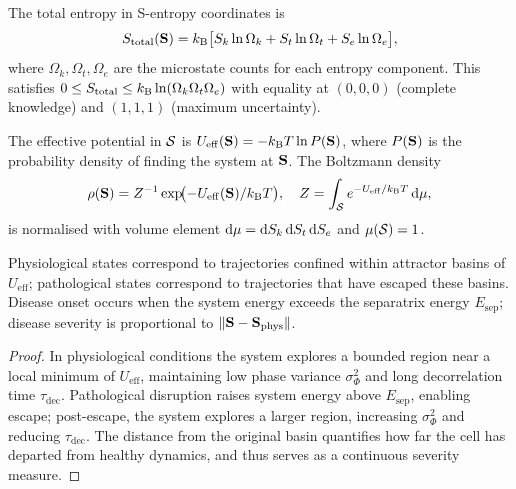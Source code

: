 The total entropy in S-entropy coordinates is
\begin{equation}
  S_{\mathrm{total}}(\mathbf{S})
  = k_{\mathrm{B}}\bigl[S_k\ln\Omega_k + S_t\ln\Omega_t + S_e\ln\Omega_e\bigr],
  \label{eq:ch07-total-entropy}
\end{equation}
where $\Omega_k,\Omega_t,\Omega_e$ are the microstate counts for each
entropy component.  This satisfies
$0 \leq S_{\mathrm{total}} \leq k_{\mathrm{B}}\ln(\Omega_k\Omega_t\Omega_e)$
with equality at $(0,0,0)$ (complete knowledge) and $(1,1,1)$ (maximum
uncertainty).

\begin{definition}
\label{def:ch07-effective-potential}
The effective potential in $\mathcal{S}$ is
$U_{\mathrm{eff}}(\mathbf{S}) = -k_{\mathrm{B}} T\ln P(\mathbf{S})$, where $P(\mathbf{S})$
is the probability density of finding the system at $\mathbf{S}$.  The
Boltzmann density
\begin{equation}
  \rho(\mathbf{S}) = Z^{-1}\exp\!\bigl(-U_{\mathrm{eff}}(\mathbf{S})/k_{\mathrm{B}} T\bigr),
  \quad
  Z = \int_{\mathcal{S}} e^{-U_{\mathrm{eff}}/k_{\mathrm{B}} T}\,\dd\mu,
  \label{eq:ch07-boltzmann}
\end{equation}
is normalised with volume element $\dd\mu = \dd S_k\,\dd S_t\,\dd S_e$ and
$\mu(\mathcal{S}) = 1$.
\end{definition}

\begin{theorem}
\label{thm:ch07-attractor-basin}
Physiological states correspond to trajectories confined within attractor
basins of $U_{\mathrm{eff}}$; pathological states correspond to trajectories
that have escaped these basins.  Disease onset occurs when the system energy
exceeds the separatrix energy $E_{\mathrm{sep}}$; disease severity is
proportional to $\|\mathbf{S} - \mathbf{S}_{\mathrm{phys}}\|$.
\end{theorem}

\begin{proof}
In physiological conditions the system explores a bounded region near a local
minimum of $U_{\mathrm{eff}}$, maintaining low phase variance
$\sigma_{\Phi}^2$ and long decorrelation time $\tau_{\mathrm{dec}}$.
Pathological disruption raises system energy above $E_{\mathrm{sep}}$,
enabling escape; post-escape, the system explores a larger region,
increasing $\sigma_{\Phi}^2$ and reducing $\tau_{\mathrm{dec}}$.  The
distance from the original basin quantifies how far the cell has departed
from healthy dynamics, and thus serves as a continuous severity measure.
\end{proof}

